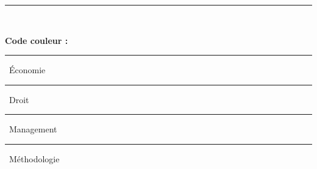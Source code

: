 \documentclass[a4paper]{article}
\begin{document}
\begin{center}
  \vfill
  \noindent\rule{\linewidth}{1pt}\\[8pt]
  {\small\color[RGB]{100,100,100}
    \textbf{Code couleur :}
    \quad \textcolor[RGB]{0,80,160}{\rule{8pt}{8pt}}~Économie
    \quad \textcolor[RGB]{160,60,0}{\rule{8pt}{8pt}}~Droit
    \quad \textcolor[RGB]{0,120,60}{\rule{8pt}{8pt}}~Management
    \quad \textcolor[RGB]{80,0,140}{\rule{8pt}{8pt}}~Méthodologie
  }
\end{center}
\restoregeometry















\end{document}
